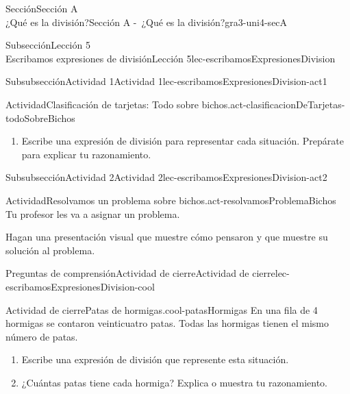 \begin{sectionptx}{Sección}{{\Large Sección A\\}¿Qué es la división?}{}{Sección A -~¿Qué es la división?}{}{}{gra3-uni4-secA}
\begin{subsectionptx}{Subsección}{{\normalsize Lección 5\\[-0.05cm]}Escribamos expresiones de división}{}{Lección 5}{}{}{lec-escribamosExpresionesDivision}
\begin{subsubsectionptx}{Subsubsección}{Actividad 1}{}{Actividad 1}{}{}{lec-escribamosExpresionesDivision-act1}
\begin{activity}{Actividad}{Clasificación de tarjetas: Todo sobre bichos.}{act-clasificacionDeTarjetas-todoSobreBichos}
\begin{enumerate}
\item{}Escribe una expresión de división para representar cada situación. Prepárate para explicar tu razonamiento.%
\end{enumerate}
\end{activity}%
\end{subsubsectionptx}
%
%
\typeout{************************************************}
\typeout{************************************************}
%
\begin{subsubsectionptx}{Subsubsección}{Actividad 2}{}{Actividad 2}{}{}{lec-escribamosExpresionesDivision-act2}
\begin{activity}{Actividad}{Resolvamos un problema sobre bichos.}{act-resolvamosProblemaBichos}%
Tu profesor les va a asignar un problema.%
\par
Hagan una presentación visual que muestre cómo pensaron y que muestre su solución al problema.%
\end{activity}%
\end{subsubsectionptx}
%
%
\typeout{************************************************}
\typeout{************************************************}
%
\begin{reading-questions-subsubsection}{Preguntas de comprensión}{Actividad de cierre}{}{Actividad de cierre}{}{}{lec-escribamosExpresionesDivision-cool}
\begin{project}{Actividad de cierre}{Patas de hormigas.}{cool-patasHormigas}%
En una fila de 4 hormigas se contaron veinticuatro patas. Todas las hormigas tienen el mismo número de patas.%
\par
%
\begin{enumerate}[label={(\alph*)}]
\item{}Escribe una expresión de división que represente esta situación.%
\item{}¿Cuántas patas tiene cada hormiga? Explica o muestra tu razonamiento.%
\end{enumerate}
%
\end{project}%
\end{reading-questions-subsubsection}
\end{subsectionptx}
%
%
\typeout{************************************************}
\typeout{************************************************}

\end{sectionptx}
